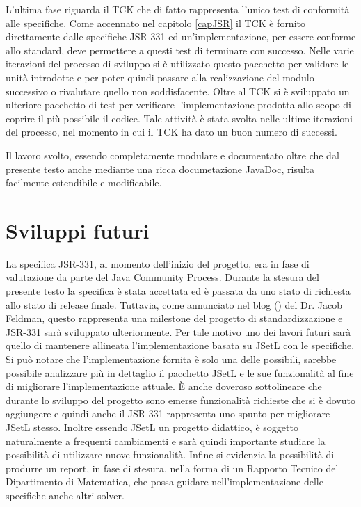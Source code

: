 L'ultima fase riguarda il TCK che di fatto rappresenta l'unico test di
conformità alle specifiche. Come accennato nel capitolo \ref{capJSR} il TCK è
fornito direttamente dalle specifiche JSR-331 ed un'implementazione, per
essere conforme allo standard, deve permettere a questi test di terminare con 
successo. Nelle varie iterazioni del processo di sviluppo si è utilizzato
questo pacchetto per validare le unità introdotte e per poter quindi
passare alla realizzazione del modulo successivo o rivalutare quello non
soddisfacente. Oltre al TCK si è sviluppato un ulteriore pacchetto di test
per verificare l'implementazione prodotta allo scopo di coprire il più
possibile il codice. Tale attività è stata svolta nelle ultime
iterazioni del processo, nel momento in cui il TCK ha dato un buon numero di
successi.

Il lavoro svolto, essendo completamente modulare e documentato oltre che dal
presente testo anche mediante una ricca documetazione JavaDoc, risulta
facilmente estendibile e modificabile. 

\section{Sviluppi futuri}
La specifica JSR-331, al momento dell'inizio del progetto, era in fase di 
valutazione da parte del Java Community Process. Durante la stesura del
presente testo la specifica è stata accettata ed è passata da uno stato di
richiesta allo stato di release finale. Tuttavia, come annunciato nel
blog (\cite{blog}) del Dr. Jacob Feldman, questo rappresenta una milestone del
progetto di standardizzazione e JSR-331 sarà sviluppato ulteriormente. Per tale
motivo uno dei lavori futuri sarà quello di mantenere allineata 
l'implementazione
basata su JSetL con le specifiche. Si può notare che
l'implementazione fornita è solo una delle possibili, sarebbe
possibile analizzare più in dettaglio il pacchetto JSetL e le sue funzionalità
al fine di migliorare l'implementazione attuale. 
\`E anche doveroso
sottolineare che durante lo sviluppo del progetto sono emerse funzionalità
richieste che si è dovuto aggiungere e quindi anche il JSR-331 
rappresenta uno spunto per migliorare JSetL stesso.
Inoltre essendo JSetL un progetto didattico, è soggetto naturalmente a frequenti
cambiamenti e sarà quindi importante studiare la possibilità di utilizzare
nuove funzionalità.
Infine si evidenzia la possibilità di produrre un report, in fase di stesura,
nella forma di un Rapporto Tecnico del Dipartimento di Matematica, che possa
guidare nell'implementazione delle specifiche anche altri solver.



